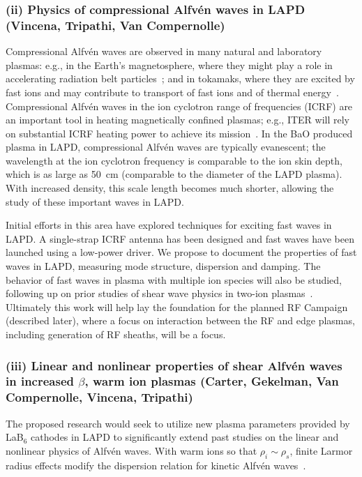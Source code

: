\documentclass[11pt]{article}
\newcommand\Alfven{Alfv\'en }
\renewcommand{\cite}{\citep}
\begin{document}
\subsubsection{(ii) Physics of compressional \Alfven waves in LAPD (Vincena, Tripathi,
Van Compernolle)}

Compressional \Alfven waves are observed in many natural and
laboratory plasmas: e.g., in the Earth's magnetosphere, where they
might play a role in accelerating radiation belt particles~\cite{horne:2007}; and in
tokamaks, where they are excited by fast ions and may contribute to
transport of fast ions and of thermal energy~\cite{gorelenkov:2010}. Compressional
\Alfven waves in the ion cyclotron range of frequencies (ICRF) are an
important tool in heating
magnetically confined plasmas; e.g., ITER will rely on substantial
ICRF heating power to achieve its mission~\cite{jaeger:2008}.
In the BaO produced plasma in LAPD, compressional \Alfven waves are
typically evanescent; the wavelength at the ion cyclotron frequency is
comparable to the ion skin depth, which is as large as 50~cm (comparable
to the diameter of the LAPD plasma).  With increased density, this
scale length becomes much shorter, allowing the study of these
important waves in LAPD.  

Initial efforts in this area have explored techniques for exciting
fast waves in LAPD.  A single-strap ICRF antenna has been designed and
fast waves have been launched using a low-power driver.  We propose to
document the properties of fast waves in LAPD, measuring mode
structure, dispersion and damping.  The behavior of fast waves in
plasma with multiple ion species will also be studied, following up on
prior studies of shear wave physics in two-ion
plasmas~\cite{vincena:2010,vincena:2011}.  Ultimately this work will
help lay the foundation for the planned RF Campaign (described later),
where a focus on interaction between the RF and edge plasmas,
including generation of RF sheaths, will be a focus.


\subsubsection{(iii) Linear and nonlinear properties of shear Alfv\'{e}n waves in
  increased $\beta$, warm ion plasmas (Carter, Gekelman, Van
  Compernolle, Vincena, Tripathi)}

The proposed research would seek to utilize new plasma parameters
provided by LaB$_6$ cathodes in LAPD to significantly extend past
studies on the linear and nonlinear physics of Alfv\'{e}n waves.  With
warm ions so that $\rho_i \sim \rho_s$, finite Larmor radius effects
modify the dispersion relation for kinetic \Alfven waves~\cite{lysak96}.
\end{document}
